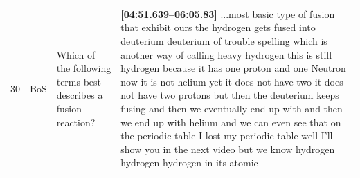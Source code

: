 \documentclass[10pt]{article}
\begin{document}
\begin{tiny}
\begin{longtable}{|r|p{0.375in}|p{1.275in}|p{3.5in}|}
30 &          BoS &                                                                                                                                                                                                                   Which of the following terms best describes a fusion reaction? &                                                                                                                                                                                                                                                                                                                                                                                                                                                                                                                                                                                                                                                                                                                                                                                                                                                                                                                                                                                                                                                                                                                                                                                                                                                                                                                                                                                                                                                                                                                                                                                                                                                                                                                                                                                                                                                                                                                                                                                                                                                                                                                                                                                                                                                                                                                                                                                                                                                                    \textbf{[04:51.639--06:05.83]} ...most basic type of fusion that exhibit ours the hydrogen gets fused into deuterium deuterium of trouble spelling which is another way of calling heavy hydrogen this is still hydrogen because it has one proton and one Neutron now it is not helium yet it does not have two it does not have two protons but then the deuterium keeps fusing and then we eventually end up with and then we end up with helium and we can even see that on the periodic table I lost my periodic table well I'll show you in the next video but we know hydrogen hydrogen hydrogen in its atomic 
\end{longtable}
\end{tiny}
\end{document}
